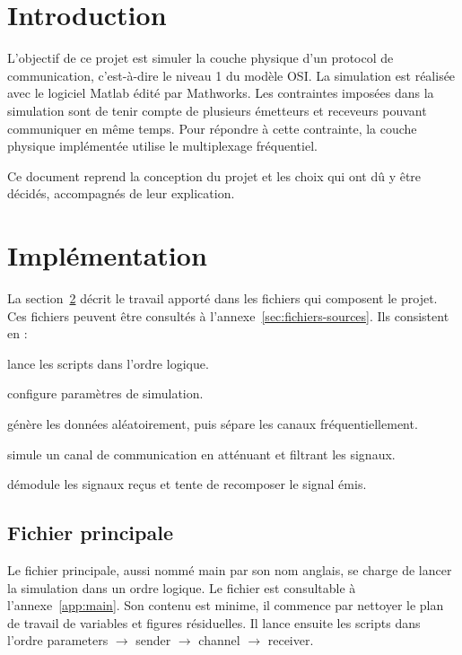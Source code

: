 \documentclass[10pt, oneside, a4paper]{article}
\begin{document}
\tableofcontents
\newpage

\section{Introduction}
L'objectif de ce projet est simuler la couche physique d'un protocol de communication, c'est-à-dire le niveau 1 du modèle OSI.
La simulation est réalisée avec le logiciel Matlab\textregistered{} édité par Mathworks\textregistered{}.
Les contraintes imposées dans la simulation sont de tenir compte de plusieurs émetteurs et receveurs pouvant communiquer en même temps.
Pour répondre à cette contrainte, la couche physique implémentée utilise le multiplexage fréquentiel.

Ce document reprend la conception du projet et les choix qui ont dû y être décidés, accompagnés de leur explication.


\section{Implémentation}
\label{sec:implementation}
La section~\ref{sec:implementation} décrit le travail apporté dans les fichiers qui composent le projet.
Ces fichiers peuvent être consultés à l'annexe~\ref{sec:fichiers-sources}.
Ils consistent en :
\begin{description}[align=right,labelwidth=2cm,labelindent=1cm]
	\item[main.m] lance les scripts dans l'ordre logique.
	\item[parameters.m] configure paramètres de simulation.
	\item[sender.m] génère les données aléatoirement, puis sépare les canaux
		fréquentiellement.
	\item[channel.m] simule un canal de communication en atténuant et filtrant les signaux.
	\item[receiver.m] démodule les signaux reçus et tente de recomposer le signal émis.
\end{description}

\subsection{Fichier principale}
Le fichier principale, aussi nommé \og{}main\fg{} par son nom anglais, se charge de lancer la simulation dans un ordre logique.
Le fichier est consultable à l'annexe~\ref{app:main}.
Son contenu est minime, il commence par nettoyer le plan de travail de variables et figures résiduelles.
Il lance ensuite les scripts dans l'ordre parameters $\rightarrow$ sender $\rightarrow$ channel $\rightarrow$ receiver.
\end{document}
